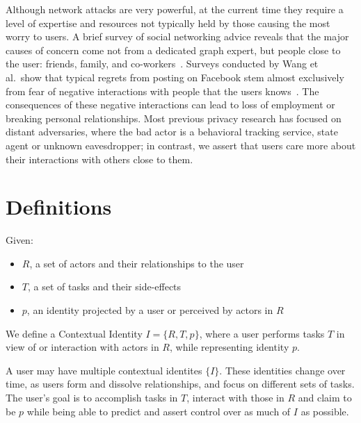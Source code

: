 \documentclass{llncs}
\begin{document}
\begin{comment}TODO: figure out how to cite this. Why is this short
paper's model worth pursuing? It's simpler, and focuses on the user rather
than data.
\end{comment}

Although network attacks are very powerful, at the current time they require a
level of expertise and resources not typically held by those causing the most
worry to users. A brief survey of social networking advice reveals that the
major causes of concern come not from a dedicated graph expert, but people
close to the user: friends, family, and co-workers~\cite{fbtips2,fbtips1}.
Surveys conducted by Wang et al.~show that typical regrets from posting on
Facebook stem almost exclusively from fear of negative interactions with people
that the users knows~\cite{wang}. The consequences of these negative
interactions can lead to loss of employment or breaking personal relationships.
Most previous privacy research has focused on distant adversaries, where the
bad actor is a behavioral tracking service, state agent or unknown
eavesdropper; in contrast, we assert that users care more about their
interactions with others close to them.

\section{Definitions}

\begin{definition}
  Given:
  \begin{itemize}
    \item $R$, a set of actors and their relationships to the user
    \item $T$, a set of tasks and their side-effects
    \item $p$, an identity projected by a user or perceived by actors in $R$
  \end{itemize}
\medskip

  We define a Contextual Identity $I = \{R,T,p\}$, where a user performs tasks
$T$ in view of or interaction with actors in $R$, while representing identity
$p$.  

\end{definition}

A user may have multiple contextual identites $\{I\}$. These identities change
over time, as users form and dissolve relationships, and focus on different
sets of tasks. The user's goal is to accomplish tasks in $T$,
interact with those in $R$ and claim to be $p$  while being able to predict and
assert control over as much of $I$ as possible.
\end{document}
